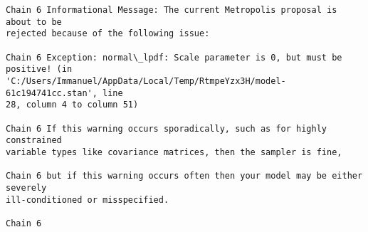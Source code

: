 \documentclass[11pt]{article}
\begin{document}
    \begin{Verbatim}[commandchars=\\\{\}]
Chain 6 Informational Message: The current Metropolis proposal is about to be
rejected because of the following issue:

Chain 6 Exception: normal\_lpdf: Scale parameter is 0, but must be positive! (in
'C:/Users/Immanuel/AppData/Local/Temp/RtmpeYzx3H/model-61c194741cc.stan', line
28, column 4 to column 51)

Chain 6 If this warning occurs sporadically, such as for highly constrained
variable types like covariance matrices, then the sampler is fine,

Chain 6 but if this warning occurs often then your model may be either severely
ill-conditioned or misspecified.

Chain 6

    \end{Verbatim}
\end{document}
